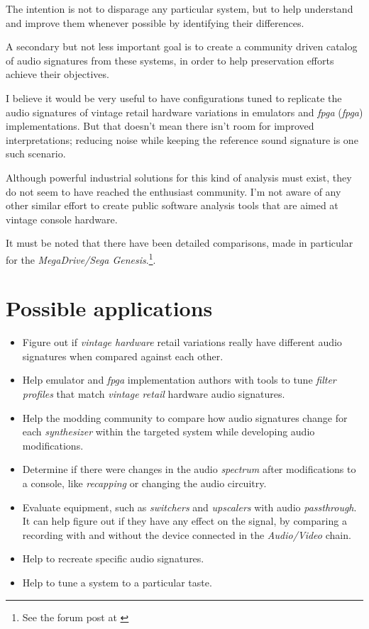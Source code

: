 \documentclass[10pt,a4paper]{report}
\newcommand{\define}[1]{\textit{\acrlong{#1}} (\textit{\acrshort{#1}})}
\newcommand{\ac}[1]{\textit{\acrshort{#1}}}
\begin{document}
The intention is not to disparage any particular system, but to help understand and improve them whenever possible by identifying their differences.

A secondary but not less important goal is to create a community driven catalog of audio signatures from these systems, in order to help preservation efforts achieve their objectives.

I believe it would be very useful to have configurations tuned to replicate the audio signatures of vintage retail hardware variations in emulators and \define{fpga} implementations. But that doesn't mean there isn't room for improved interpretations; reducing noise while keeping the reference sound signature is one such scenario.

Although powerful industrial solutions for this kind of analysis must exist, they do not seem to have reached the enthusiast community. I'm not aware of any other similar effort to create public software analysis tools that are aimed at vintage console hardware.

It must be noted that there have been detailed comparisons, made in particular for the \textit{MegaDrive/Sega Genesis}.\footnote{See the forum post at \cite{genesisaudio}}. 

\section{Possible applications}

\begin{itemize}
	\item Figure out if \textit{vintage hardware} retail variations really have different audio signatures when compared against each other.
	\item Help emulator and \ac{fpga} implementation authors with tools to tune \textit{filter profiles} that match \textit{vintage retail} hardware audio signatures.
	\item Help the modding community to compare how audio signatures change for each \textit{synthesizer} within the targeted system while developing audio modifications.
	\item Determine if there were changes in the audio \textit{spectrum} after modifications to a console, like \textit{recapping} or changing the audio circuitry.
	\item Evaluate equipment, such as \textit{switchers} and \textit{upscalers} with audio \textit{passthrough}. It can help figure out if they have any effect on the signal, by comparing a recording with and without the device connected in the \textit{Audio/Video} chain.
	\item Help to recreate specific audio signatures.
	\item Help to tune a system to a particular taste.
\end{itemize}
\end{document}

